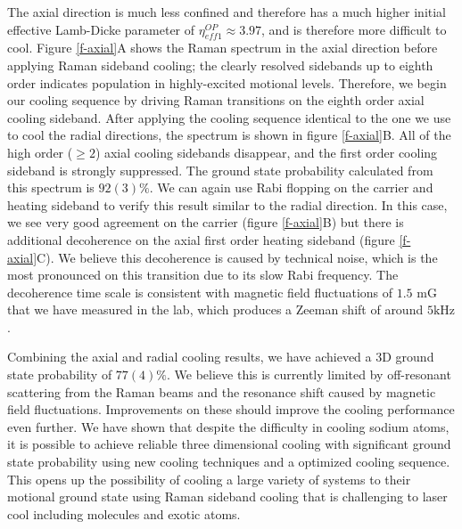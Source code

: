 \documentclass[aps,prl,twocolumn,groupedaddress]{revtex4-1}
\begin{document}
The axial direction is much less confined and therefore has a much higher initial effective
Lamb-Dicke parameter of $\eta^{OP}_{eff1}\approx 3.97$, and is therefore more difficult to cool.
Figure \ref{f-axial}A shows the Raman spectrum in the axial direction
before applying Raman sideband cooling; the clearly resolved sidebands
up to eighth order indicates population in highly-excited motional levels.
Therefore, we begin our cooling sequence by driving Raman transitions on the eighth order axial
cooling sideband. After applying the cooling sequence identical to the one we use to cool
the radial directions, the spectrum is shown in figure \ref{f-axial}B.
All of the high order ($\geqslant2$) axial cooling sidebands disappear, and the first order
cooling sideband is strongly suppressed.
The ground state probability calculated from this spectrum is $92(3)\%$.
We can again use Rabi flopping on the carrier and heating sideband to verify this result
similar to the radial direction. In this case, we see very good agreement on the carrier
(figure \ref{f-axial}B) but there is additional decoherence on the axial first order
heating sideband (figure \ref{f-axial}C).
We believe this decoherence is caused by technical noise, which is the most pronounced
on this transition due to its slow Rabi frequency.
The decoherence time scale is consistent with magnetic field fluctuations of $1.5$ mG that we have measured in the lab, which produces
a Zeeman shift of around $5\text{kHz}$.

Combining the axial and radial cooling results,
we have achieved a 3D ground state probability of $77(4)\%$.
We believe this is currently limited by off-resonant scattering from the Raman beams
and the resonance shift caused by magnetic field fluctuations.
Improvements on these  should improve the cooling performance even further.
We have shown that despite the difficulty in cooling sodium atoms,
it is possible to achieve reliable three dimensional cooling with significant ground state
probability using new cooling techniques and a optimized cooling sequence.
This opens up the possibility of cooling a large variety of systems to their motional ground
state using Raman sideband cooling that is challenging to laser cool
including molecules and exotic atoms.



\end{document}
